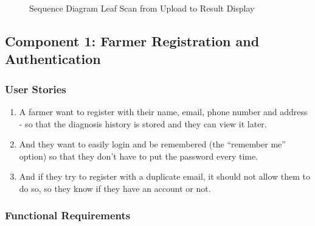 \documentclass[12pt,a4paper]{article}
\begin{document}
\begin{figure}[H]
\caption{Sequence Diagram Leaf Scan from Upload to Result Display}
\label{fig:sequence}
\end{figure}


\subsection{Component 1: Farmer Registration and Authentication}

\subsubsection*{User Stories}

\begin{enumerate}[leftmargin=2em]
  \item A farmer want to register with their name, email, phone number and address - so that the diagnosis history is stored and they can view it later.
  \item And they want to easily login and be remembered (the ``remember me'' option) so that they don't have to put the password every time.
  \item And if they try to register with a duplicate email, it should not allow them to do so, so they know if they have an account or not.
\end{enumerate}

\subsubsection*{Functional Requirements}
\end{document}
